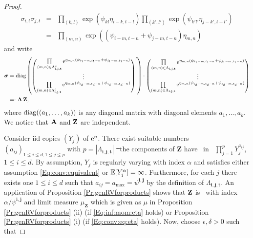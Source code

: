 \begin{proof}
\begin{eqnarray*}
\sigma_{i,t}\sigma_{j,t}&=&\prod_{(k,l)}\exp(\psi_{kl}\eta_{i-k,t-l})\prod_{(k',l' )}\exp(\psi_{k'l'}\eta_{j-k',t-l'}) \\
&=& \prod_{(m,n )}\exp((\psi_{i-m,t-n}+\psi_{j-m,t-n})\eta_{m,n})
\end{eqnarray*}
and write
\begin{align} \nonumber \boldsymbol{\sigma}&= \mbox{diag}\left(\left(
  \begin{matrix}
  \prod\limits_{(m,n) \in \Lambda_{\mathbf{i},\mathbf{j},\mathbf{t}}^c}{\rm e}^{\eta_{m,n}(\psi_{i_1-m,t_1-n}+\psi_{j_1-m,t_1-n})} \\ \vdots \\ \prod\limits_{(m,n) \in \Lambda_{\mathbf{i},\mathbf{j},\mathbf{t}}^c}{\rm e}^{\eta_{m,n}(\psi_{i_d-m,t_d-n}+\psi_{j_d-m,t_d-n})}
  \end{matrix}
\right)'\right)\cdot \left(\begin{matrix}
                   \prod\limits_{(m,n) \in \Lambda_{\mathbf{i},\mathbf{j},\mathbf{t}}}{\rm e}^{\eta_{m,n}(\psi_{i_1-m,t_1-n}+\psi_{j_1-m,t_1-n})} \\ \vdots \\ \prod\limits_{(m,n) \in \Lambda_{\mathbf{i},\mathbf{j},\mathbf{t}}}{\rm e}^{\eta_{m,n}(\psi_{i_d-m,t_d-n}+\psi_{j_d-m,t_d-n})}
                   \end{matrix}
 \right)\\
\label{Eq:factors:sigma} &=: \mathbf{A}\, \mathbf{Z},
\end{align}
where ${\rm diag}((a_1,\ldots,a_k))$ is any diagonal matrix with diagonal elements $a_1,\ldots,a_k$. 
We notice that ${\bf A}$ and ${\bf Z}$ are independent.
\par
Consider iid copies $(Y_j)$ of ${\rm e}^\eta$. There exist suitable numbers $(a_{ij})_{1\le i\le d,1\le j\le p}$ with $p= |\Lambda_{\mathbf{i},\mathbf{j},\mathbf{t}}|$
\st\ the components of $\mathbf{Z}$ have \rep\ in \ds\ 
$\prod_{j=1}^{p}Y_j^{a_{ij}}$, $1 \leq i \leq d $. By assumption, $Y_j$ is regularly varying with index $\alpha$ and
satisfies either assumption \eqref{Eq:conv:equivalent} or ${\mathbb E}[Y_j^\alpha]=\infty$. 
Furthermore, for each $j$ there exists one $1\leq i \leq d$ 
such that $a_{ij}=a_{\max}=\psi^{\mathbf{i},\mathbf{j}}$ by the definition of $\Lambda_{\mathbf{i},\mathbf{j},\mathbf{t}}$. 
An application of Proposition \ref{Pr:genRVforproducts} shows that ${\bf Z}$ is \regvary\ 
with index $\alpha/\psi^{\mathbf{i},\mathbf{j}}$ and limit measure $\mu_{\mathbf{Z}}$ which is given as $\mu$ in Proposition \ref{Pr:genRVforproducts} (ii) (if \eqref{Eq:inf:mom:eta} holds) or Proposition \ref{Pr:genRVforproducts} (i) (if \eqref{Eq:conv:eq:eta} holds). Now, choose $\epsilon, \delta>0$ such that

\end{proof}
